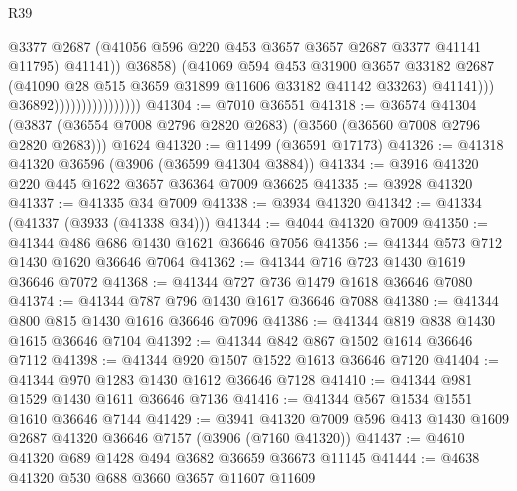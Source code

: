 \begin{lexlean}{R39}
\begin{coremodule}
                                              @3377
                                              @2687
                                              (@41056
                                                @596
                                                @220
                                                @453
                                                @3657
                                                @3657
                                                @2687
                                                @3377
                                                @41141
                                                @11795)
                                              @41141))
                                          @36858)
                                        (@41069
                                          @594
                                          @453
                                          @31900
                                          @3657
                                          @33182
                                          @2687
                                          (@41090 @28 @515 @3659 @31899 @11606 @33182 @41142 @33263)
                                          @41141)))
                                    @36892))))))))))))))))
@41304 := @7010 @36551
@41318 := @36574
    @41304
    (@3837 (@36554 @7008 @2796 @2820 @2683) (@3560 (@36560 @7008 @2796 @2820 @2683)))
    @1624
@41320 := @11499 (@36591 @17173)
@41326 := @41318 @41320 @36596 (@3906 (@36599 @41304 @3884))
@41334 := @3916 @41320 @220 @445 @1622 @3657 @36364 @7009 @36625
@41335 := @3928 @41320
@41337 := @41335 @34 @7009
@41338 := @3934 @41320
@41342 := @41334 (@41337 (@3933 (@41338 @34)))
@41344 := @4044 @41320 @7009
@41350 := @41344 @486 @686 @1430 @1621 @36646 @7056
@41356 := @41344 @573 @712 @1430 @1620 @36646 @7064
@41362 := @41344 @716 @723 @1430 @1619 @36646 @7072
@41368 := @41344 @727 @736 @1479 @1618 @36646 @7080
@41374 := @41344 @787 @796 @1430 @1617 @36646 @7088
@41380 := @41344 @800 @815 @1430 @1616 @36646 @7096
@41386 := @41344 @819 @838 @1430 @1615 @36646 @7104
@41392 := @41344 @842 @867 @1502 @1614 @36646 @7112
@41398 := @41344 @920 @1507 @1522 @1613 @36646 @7120
@41404 := @41344 @970 @1283 @1430 @1612 @36646 @7128
@41410 := @41344 @981 @1529 @1430 @1611 @36646 @7136
@41416 := @41344 @567 @1534 @1551 @1610 @36646 @7144
@41429 := @3941 @41320 @7009 @596 @413 @1430 @1609 @2687 @41320 @36646 @7157 (@3906 (@7160 @41320))
@41437 := @4610 @41320 @689 @1428 @494 @3682 @36659 @36673 @11145
@41444 := @4638 @41320 @530 @688 @3660 @3657 @11607 @11609

\end{coremodule}
\end{lexlean}
